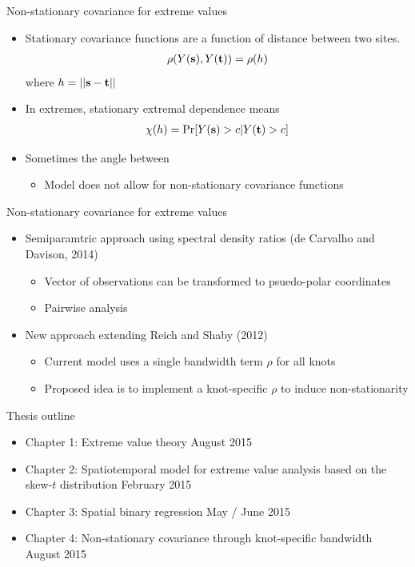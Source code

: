 \documentclass{beamer}
\begin{document}
\begin{frame}{Non-stationary covariance for extreme values}
  \begin{itemize} \setlength{\itemsep}{0.5em}
    \item Stationary covariance functions are a function of distance between two sites.
    \begin{align*}
      \rho(Y(\mbox{\bf s}), Y(\mbox{\bf t})) = \rho(h)
    \end{align*}
    where $h = ||\mbox{\bf s} - \mbox{\bf t}||$
    \item In extremes, stationary extremal dependence means
    \begin{align*}
      \chi(h) = \Pr[Y(\mbox{\bf s}) > c | Y(\mbox{\bf t}) > c]
    \end{align*}
    \item Sometimes the angle between
    \begin{itemize}
      \item Model does not allow for non-stationary covariance functions
    \end{itemize}
  \end{itemize}
\end{frame}

\begin{frame}{Non-stationary covariance for extreme values}
  \begin{itemize} \setlength{\itemsep}{0.5em}
    \item Semiparamtric approach using spectral density ratios (de Carvalho and Davison, 2014)
    \begin{itemize}
      \item Vector of observations can be transformed to psuedo-polar coordinates
      \item Pairwise analysis
    \end{itemize}
    \item New approach extending Reich and Shaby (2012)
    \begin{itemize}
      \item Current model uses a single bandwidth term $\rho$ for all knots
      \item Proposed idea is to implement a knot-specific $\rho$ to induce non-stationarity
    \end{itemize}
  \end{itemize}
\end{frame}


\begin{frame}{Thesis outline}
  \begin{itemize} \setlength{\itemsep}{0.5em}
    \item Chapter 1: Extreme value theory \alert{August 2015}
    \item Chapter 2: Spatiotemporal model for extreme value analysis based on the skew-$t$ distribution \alert{February 2015}
    \item Chapter 3: Spatial binary regression \alert{May / June 2015}
    \item Chapter 4: Non-stationary covariance through knot-specific bandwidth \alert{August 2015}
  \end{itemize}
\end{frame}
\end{document}
